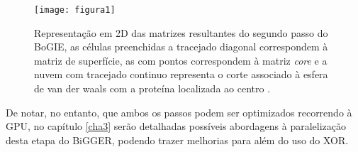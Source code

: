 %
% 


\begin{figure}[ht]
  \centering
    {\texttt{[image: figura1]}}
  \caption{Representação em 2D das matrizes resultantes do segundo passo do BoGIE, as células preenchidas a tracejado diagonal correspondem à matriz de superfície, as com pontos correspondem à matriz \textit{core} e a nuvem com tracejado continuo representa o corte associado à esfera de van der waals com a proteína localizada ao centro \cite{biggerPaper}.}
  \label{fig:fig2subfig}
\end{figure}

De notar, no entanto, que ambos os passos podem ser optimizados recorrendo à GPU, no capítulo \ref{cha3} serão detalhadas possíveis abordagens à paralelização desta etapa do BiGGER, podendo trazer melhorias para além do uso do XOR.

